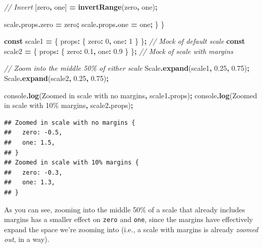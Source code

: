 \documentclass[
]{book}
\newenvironment{Shaded}{\begin{snugshade}}{\end{snugshade}}
\newcommand{\AttributeTok}[1]{\textcolor[rgb]{0.13,0.29,0.53}{#1}}
\newcommand{\BuiltInTok}[1]{#1}
\newcommand{\CommentTok}[1]{\textcolor[rgb]{0.56,0.35,0.01}{\textit{#1}}}
\newcommand{\DecValTok}[1]{\textcolor[rgb]{0.00,0.00,0.81}{#1}}
\newcommand{\FloatTok}[1]{\textcolor[rgb]{0.00,0.00,0.81}{#1}}
\newcommand{\FunctionTok}[1]{\textcolor[rgb]{0.13,0.29,0.53}{\textbf{#1}}}
\newcommand{\KeywordTok}[1]{\textcolor[rgb]{0.13,0.29,0.53}{\textbf{#1}}}
\newcommand{\NormalTok}[1]{#1}
\newcommand{\OperatorTok}[1]{\textcolor[rgb]{0.81,0.36,0.00}{\textbf{#1}}}
\newcommand{\VerbatimStringTok}[1]{\textcolor[rgb]{0.31,0.60,0.02}{#1}}
\theoremstyle{definition}
\theoremstyle{definition}
\theoremstyle{definition}
\theoremstyle{definition}
\theoremstyle{remark}
\begin{document}
\begin{Shaded}
\begin{Highlighting}[]
    \CommentTok{// Invert}
\NormalTok{    [zero}\OperatorTok{,}\NormalTok{ one] }\OperatorTok{=} \FunctionTok{invertRange}\NormalTok{(zero}\OperatorTok{,}\NormalTok{ one)}\OperatorTok{;}

\NormalTok{    scale}\OperatorTok{.}\AttributeTok{props}\OperatorTok{.}\AttributeTok{zero} \OperatorTok{=}\NormalTok{ zero}\OperatorTok{;}
\NormalTok{    scale}\OperatorTok{.}\AttributeTok{props}\OperatorTok{.}\AttributeTok{one} \OperatorTok{=}\NormalTok{ one}\OperatorTok{;}
\NormalTok{  \}}
\NormalTok{\}}

\KeywordTok{const}\NormalTok{ scale1 }\OperatorTok{=}\NormalTok{ \{ props}\OperatorTok{:}\NormalTok{ \{ zero}\OperatorTok{:} \DecValTok{0}\OperatorTok{,}\NormalTok{ one}\OperatorTok{:} \DecValTok{1}\NormalTok{ \} \}}\OperatorTok{;} \CommentTok{// Mock of default scale}
\KeywordTok{const}\NormalTok{ scale2 }\OperatorTok{=}\NormalTok{ \{ props}\OperatorTok{:}\NormalTok{ \{ zero}\OperatorTok{:} \FloatTok{0.1}\OperatorTok{,}\NormalTok{ one}\OperatorTok{:} \FloatTok{0.9}\NormalTok{ \} \}}\OperatorTok{;} \CommentTok{// Mock of scale with margins}

\CommentTok{// Zoom into the middle 50\% of either scale}
\NormalTok{Scale}\OperatorTok{.}\FunctionTok{expand}\NormalTok{(scale1}\OperatorTok{,} \FloatTok{0.25}\OperatorTok{,} \FloatTok{0.75}\NormalTok{)}\OperatorTok{;}
\NormalTok{Scale}\OperatorTok{.}\FunctionTok{expand}\NormalTok{(scale2}\OperatorTok{,} \FloatTok{0.25}\OperatorTok{,} \FloatTok{0.75}\NormalTok{)}\OperatorTok{;}

\BuiltInTok{console}\OperatorTok{.}\FunctionTok{log}\NormalTok{(}\VerbatimStringTok{\textasciigrave{}Zoomed in scale with no margins\textasciigrave{}}\OperatorTok{,}\NormalTok{ scale1}\OperatorTok{.}\AttributeTok{props}\NormalTok{)}\OperatorTok{;}
\BuiltInTok{console}\OperatorTok{.}\FunctionTok{log}\NormalTok{(}\VerbatimStringTok{\textasciigrave{}Zoomed in scale with 10\% margins\textasciigrave{}}\OperatorTok{,}\NormalTok{ scale2}\OperatorTok{.}\AttributeTok{props}\NormalTok{)}\OperatorTok{;}
\end{Highlighting}
\end{Shaded}

\begin{verbatim}
## Zoomed in scale with no margins {
##   zero: -0.5,
##   one: 1.5,
## }
## Zoomed in scale with 10% margins {
##   zero: -0.3,
##   one: 1.3,
## }
\end{verbatim}

As you can see, zooming into the middle 50\% of a scale that already includes margins has a smaller effect on \texttt{zero} and \texttt{one}, since the margins have effectively expand the space we're zooming into (i.e., a scale with margins is already \emph{zoomed out}, in a way).
\end{document}
